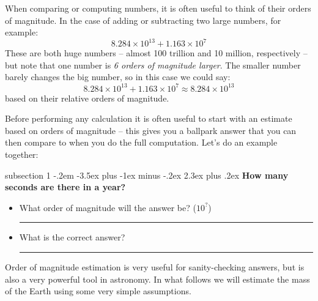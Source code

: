\documentclass[12pt]{article}
\makeatletter
\newenvironment{problem}{\@startsection
       {subsection}
       {1}
       {-.2em}
       {-3.5ex plus -1ex minus -.2ex}
       {2.3ex plus .2ex}
       {\pagebreak[3]%
       \normalsize\bf\noindent{Problem }
       }
       }
       {%
       }
\makeatother
\begin{document}
 When comparing or computing numbers, it is often useful to think of their orders of magnitude. In the case of adding or subtracting two large numbers, for example:
 \begin{equation*}
	8.284\times10^{13} + 1.163\times10^{7}
 \end{equation*}
These are both huge numbers -- almost 100 trillion and 10 million, respectively -- but note that one number is \emph{6 orders of magnitude larger}. The smaller number barely changes the big number, so in this case we could say:
 \begin{equation*}
	8.284\times10^{13} + 1.163\times10^{7} \approx 8.284\times10^{13}
 \end{equation*}
 based on their relative orders of magnitude.
 
 
Before performing any calculation it is often useful to start with an estimate based on orders of magnitude -- this gives you a ballpark answer that you can then compare to when you do the full computation. Let's do an example together:

\begin{problem}{ }
	\noindent\textbf{How many seconds are there in a year?}
	 \begin{itemize}
	 	\item What order of magnitude will the answer be? ($10^?$) \rule{3cm}{0.75pt}
		\item What is the correct answer? \rule{3cm}{0.75pt}
	\end{itemize}
\end{problem}
\clearpage
Order of magnitude estimation is very useful for sanity-checking answers, but is also a very powerful tool in astronomy. In what follows we will estimate the mass of the Earth using some very simple assumptions.

%
%
\end{document}
